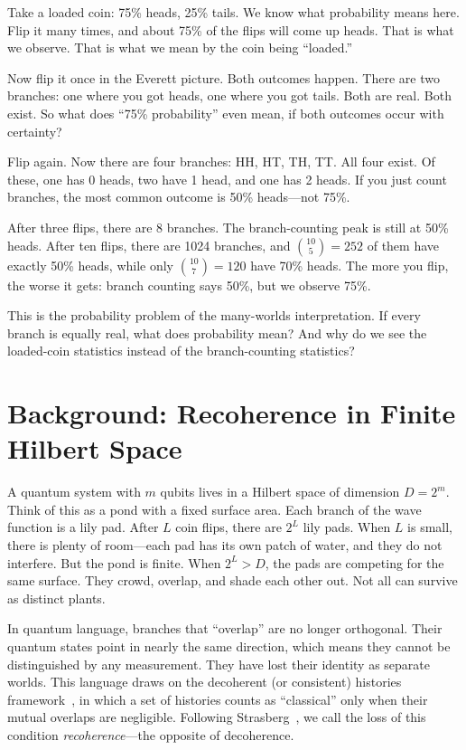 \documentclass[aps,prd,twocolumn,showpacs,preprintnumbers,amsmath,amssymb,nofootinbib]{revtex4-2}
\begin{document}
Take a loaded coin: 75\% heads, 25\% tails. We know what probability means here.
Flip it many times, and about 75\% of the flips will come up heads. That is what
we observe. That is what we mean by the coin being ``loaded.''

Now flip it once in the Everett picture. Both outcomes happen. There are two
branches: one where you got heads, one where you got tails. Both are real. Both
exist. So what does ``75\% probability'' even mean, if both outcomes occur with
certainty?

Flip again. Now there are four branches: HH, HT, TH, TT. All four exist. Of
these, one has 0 heads, two have 1 head, and one has 2 heads. If you just count
branches, the most common outcome is 50\% heads---not 75\%.

After three flips, there are 8 branches. The branch-counting peak is still at
50\% heads. After ten flips, there are 1024 branches, and $\binom{10}{5} = 252$
of them have exactly 50\% heads, while only $\binom{10}{7} = 120$ have 70\% heads.
The more you flip, the worse it gets: branch counting says 50\%, but we observe
75\%.

This is the probability problem of the many-worlds interpretation. If every branch
is equally real, what does probability mean? And why do we see the loaded-coin
statistics instead of the branch-counting statistics?


\section{Background: Recoherence in Finite Hilbert Space}
\label{sec:background}

A quantum system with $m$ qubits lives in a Hilbert space of dimension $D = 2^m$.
Think of this as a pond with a fixed surface area. Each branch of the wave function
is a lily pad. After $L$ coin flips, there are $2^L$ lily pads. When $L$ is small,
there is plenty of room---each pad has its own patch of water, and they do not
interfere. But the pond is finite. When $2^L > D$, the pads are competing for the
same surface. They crowd, overlap, and shade each other out. Not all can survive
as distinct plants.

In quantum language, branches that ``overlap'' are no longer orthogonal. Their
quantum states point in nearly the same direction, which means they cannot be
distinguished by any measurement. They have lost their identity as separate
worlds. This language draws on the decoherent (or consistent) histories
framework~\cite{Griffiths1984, GellMannHartle1990}, in which a set of histories
counts as ``classical'' only when their mutual overlaps are negligible.
Following Strasberg~\cite{Strasberg2025}, we call the loss of this condition
\emph{recoherence}---the opposite of decoherence.
\end{document}
